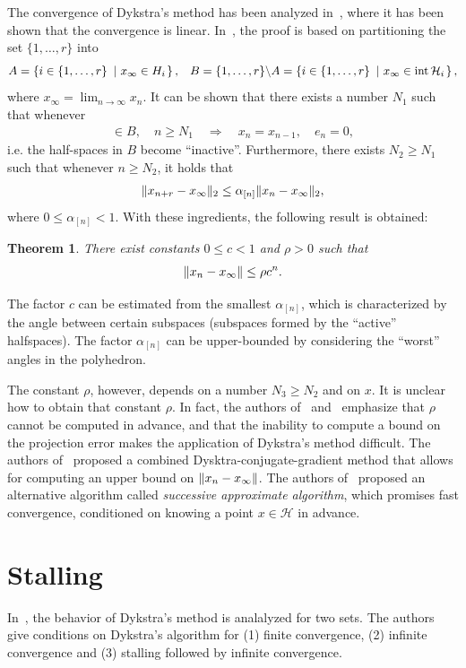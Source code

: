\documentclass[hidelinks]{article}
\newtheorem{theorem}{Theorem}
\begin{document}
The convergence of Dykstra's method has been analyzed in~\cite{DYKSTRAPOLY2,DYKSTRAPOLY}, where it has been shown that the convergence is linear. In~\cite{DYKSTRAPOLY}, the proof is based on partitioning the set $\lbrace 1,\dots,r\rbrace$ into
\begin{align}
&A=\left\{ i\in\lbrace 1,\dots,r\rbrace\ \left| \ x_\infty\in H_i \right. \right\},
&B=\lbrace 1,\dots,r\rbrace\backslash A=\left\{ i\in\lbrace 1,\dots,r\rbrace\ \left| \ x_\infty\in\text{int}\,\mathcal{H}_i \right. \right\},
\end{align}
where $x_\infty=\lim_{n\rightarrow\infty}x_n$. It can be shown that there exists a number $N_1$ such that whenever
\begin{align}
[n]\in B,\quad n\geq N_1\quad\Rightarrow\quad x_n=x_{n-1},\quad e_n=0,
\end{align}
i.e. the half-spaces in $B$ become ``inactive''. Furthermore, there exists $N_2\geq N_1$ such that whenever $n\geq N_2$, it holds that
\begin{align}
\Vert x_{n+r}-x_\infty \Vert_2\leq\alpha_{[n]}\Vert x_n-x_\infty \Vert_2,
\end{align}
where $0\leq\alpha_{[n]}<1$. With these ingredients, the following result is obtained:
\begin{theorem}
There exist constants $0\leq c < 1$ and $\rho > 0$ such that
\begin{align*}
\Vert x_n -x_\infty \Vert \leq \rho c^n.
\end{align*}
\end{theorem}
The factor $c$ can be estimated from the smallest $\alpha_{[n]}$, which is characterized by the angle between certain subspaces (subspaces formed by the ``active'' halfspaces). The factor $\alpha_{[n]}$ can be upper-bounded by considering the ``worst'' angles in the polyhedron.

The constant $\rho$, however, depends on a number $N_3\geq N_2$ and on $x$. It is unclear how to obtain that constant $\rho$. In fact, the authors of~\cite{DYKSTRAPERKINS} and~\cite{XUPOLY} emphasize that $\rho$ cannot be computed in advance, and that the inability to compute a bound on the projection error makes the application of Dykstra's method difficult. The authors of~\cite{DYKSTRAPERKINS} proposed a combined Dysktra-conjugate-gradient method that allows for computing an upper bound on $\Vert x_n -x_\infty \Vert$. The authors of~\cite{XUPOLY} proposed an alternative algorithm called \emph{successive approximate algorithm}, which promises fast convergence, conditioned on knowing a point $x\in\mathcal{H}$ in advance.
%
\section{Stalling}
%
In~\cite{DYKSTRASTALLING}, the behavior of Dykstra's method is analalyzed for two sets. The authors give conditions on Dykstra's algorithm for (1) finite convergence, (2) infinite convergence and (3) stalling followed by infinite convergence. 
\end{document}
